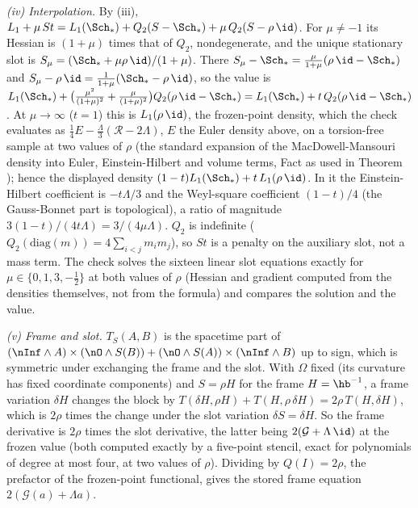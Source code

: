 \emph{(iv) Interpolation.} By (iii), $L_{1} + \mu\,St = L_{1}(\Sch_{*}) + Q_{2}(S - \Sch_{*}) + \mu\,Q_{2}(S - \rho\,\id)$. For $\mu \neq -1$ its Hessian is $(1 + \mu)$ times that of $Q_{2}$, nondegenerate, and the unique stationary slot is $S_{\mu} = (\Sch_{*} + \mu\rho\,\id)/(1 + \mu)$. There $S_{\mu} - \Sch_{*} = \tfrac{\mu}{1+\mu}(\rho\,\id - \Sch_{*})$ and $S_{\mu} - \rho\,\id = \tfrac{1}{1+\mu}(\Sch_{*} - \rho\,\id)$, so the value is $L_{1}(\Sch_{*}) + \bigl(\tfrac{\mu^{2}}{(1+\mu)^{2}} + \tfrac{\mu}{(1+\mu)^{2}}\bigr)Q_{2}(\rho\,\id - \Sch_{*}) = L_{1}(\Sch_{*}) + t\,Q_{2}(\rho\,\id - \Sch_{*})$. At $\mu \to \infty$ ($t = 1$) this is $L_{1}(\rho\,\id)$, the frozen-point density, which the check evaluates as $\tfrac14 E - \tfrac{\Lambda}{3}(\mathcal{R} - 2\Lambda)$, $E$ the Euler density above, on a torsion-free sample at two values of $\rho$ (the standard expansion of the MacDowell-Mansouri density into Euler, Einstein-Hilbert and volume terms, Fact  as used in Theorem ); hence the displayed density $(1 - t)L_{1}(\Sch_{*}) + t\,L_{1}(\rho\,\id)$. In it the Einstein-Hilbert coefficient is $-t\Lambda/3$ and the Weyl-square coefficient $(1-t)/4$ (the Gauss-Bonnet part is topological), a ratio of magnitude $3(1-t)/(4t\Lambda) = 3/(4\mu\Lambda)$. $Q_{2}$ is indefinite ($Q_{2}(\mathrm{diag}(m)) = 4\sum_{i<j}m_{i}m_{j}$), so $St$ is a penalty on the auxiliary slot, not a mass term. The check solves the sixteen linear slot equations exactly for $\mu \in \{0, 1, 3, -\tfrac12\}$ at both values of $\rho$ (Hessian and gradient computed from the densities themselves, not from the formula) and compares the solution and the value.

\emph{(v) Frame and slot.} $T_{S}(A, B)$ is the spacetime part of $(\nInf \wedge A)\times(\nO \wedge S(B)) + (\nO \wedge S(A))\times(\nInf \wedge B)$ up to sign, which is symmetric under exchanging the frame and the slot. With $\Omega$ fixed (its curvature has fixed coordinate components) and $S = \rho H$ for the frame $H = \hb^{-1}$, a frame variation $\delta H$ changes the block by $T(\delta H, \rho H) + T(H, \rho\,\delta H) = 2\rho\,T(H, \delta H)$, which is $2\rho$ times the change under the slot variation $\delta S = \delta H$. So the frame derivative is $2\rho$ times the slot derivative, the latter being $2(\mathcal{G} + \Lambda\,\id)$ at the frozen value (both computed exactly by a five-point stencil, exact for polynomials of degree at most four, at two values of $\rho$). Dividing by $Q(I) = 2\rho$, the prefactor of the frozen-point functional, gives the stored frame equation $2(\mathcal{G}(a) + \Lambda a)$.

